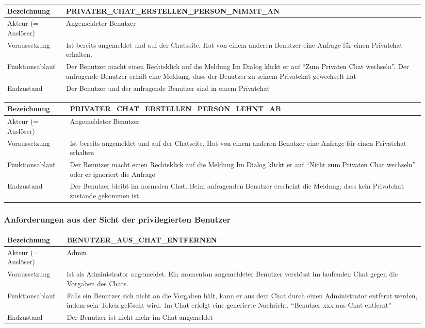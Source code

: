 \documentclass[12pt]{article}
\newcommand{\requirementTable}[5]{
    \begin{table}[H]
      \begin{tabularx}{\textwidth}{|l|X|}
        \hline
        Bezeichnung & #1  \\ \hline
        Akteur (= Auslöser) & #2  \\ \hline
        Voraussetzung & #3  \\ \hline
        Funktionsablauf & #4  \\ \hline
        Endzustand & #5  \\ \hline
      \end{tabularx}
    \end{table}
}
\begin{document}
                   
        \requirementTable
            {PRIVATER\_CHAT\_ERSTELLEN\_PERSON\_\newline NIMMT\_AN }
            {Angemeldeter Benutzer}
            {
            Ist bereits angemeldet und auf der Chatseite. \newline
            Hat von einem anderen Benutzer eine Anfrage für einen Privatchat erhalten.}
            {
            Der Benutzer macht einen Rechtsklick auf die Meldung Im Dialog klickt er auf “Zum Privaten Chat wechseln”. \newline
            Der anfragende Benutzer erhält eine Meldung, dass der Benutzer zu seinem Privatchat gewechselt hat
            }
            {Der Benutzer und der anfragende Benutzer sind in einem Privatchat}
            
                   
        \requirementTable
            {PRIVATER\_CHAT\_ERSTELLEN\_PERSON\_\newline LEHNT\_AB}
            {Angemeldeter Benutzer}
            {
            Ist bereits angemeldet und auf der Chatseite. \newline
            Hat von einem anderen Benutzer eine Anfrage für einen Privatchat erhalten
            }
            {
            Der Benutzer macht einen Rechtsklick auf die Meldung Im Dialog klickt er auf “Nicht zum Privaten Chat wechseln”\newline
            oder er ignoriert die Anfrage
            }
            {
            Der Benutzer bleibt im normalen Chat. \newline
            Beim anfragenden Benutzer erscheint die Meldung, dass kein Privatchat zustande gekommen ist.
            }
            

      \subsubsection{Anforderungen aus der Sicht der privilegierten Benutzer}
        \requirementTable
            {BENUTZER\_AUS\_CHAT\_ENTFERNEN}
            {Admin}
            {
            ist als Administrator angemeldet. \newline 
            Ein momentan angemeldeter Benutzer verstösst im laufenden Chat gegen die Vorgaben des Chats.
            }
            {
            Falls ein Benutzer sich nicht an die Vorgaben hält, kann er aus dem Chat durch einen Administrator entfernt werden, indem sein Token gelöscht wird. \newline
            Im Chat erfolgt eine generierte Nachricht, “Benutzer xxx aus Chat entfernt”
            }
            {Der Benutzer ist nicht mehr im Chat angemeldet}
            
\end{document}
